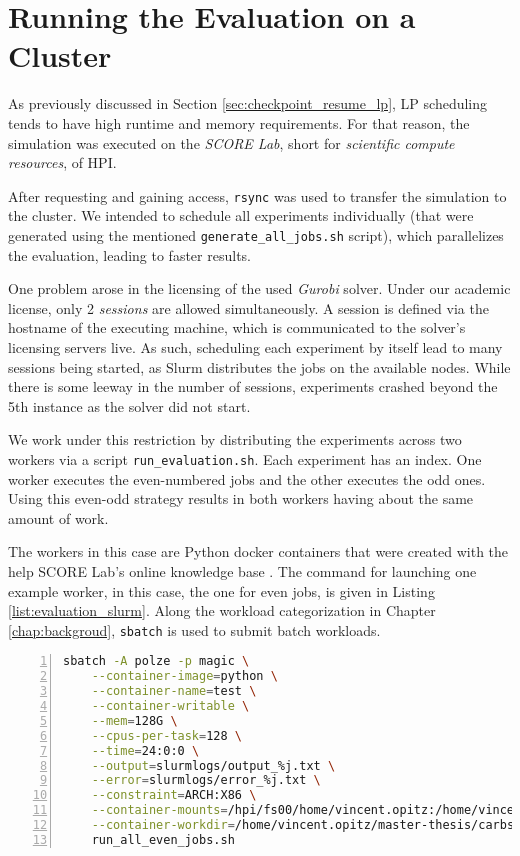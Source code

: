 \section{Running the Evaluation on a Cluster}

As previously discussed in Section \ref{sec:checkpoint_resume_lp}, LP scheduling tends to have high runtime and memory requirements. 
For that reason, the simulation was executed on the \emph{SCORE Lab}, short for \emph{scientific compute resources}, of HPI.

After requesting and gaining access, \verb|rsync| was used to transfer the simulation to the cluster. 
We intended to schedule all experiments individually (that were generated using the mentioned \verb|generate_all_jobs.sh| script), which parallelizes the evaluation, leading to faster results.

One problem arose in the licensing of the used \emph{Gurobi} solver. 
Under our academic license, only 2 \emph{sessions} are allowed simultaneously.
A session is defined via the hostname of the executing machine, which is communicated to the solver's licensing servers live.
As such, scheduling each experiment by itself lead to many sessions being started, as Slurm distributes the jobs on the available nodes.
While there is some leeway in the number of sessions, experiments crashed beyond the 5th instance as the solver did not start.

We work under this restriction by distributing the experiments across two workers via a script \verb|run_evaluation.sh|.
Each experiment has an index.
One worker executes the even-numbered jobs and the other executes the odd ones. 
Using this even-odd strategy results in both workers having about the same amount of work.

The workers in this case are Python docker containers that were created with the help SCORE Lab's online knowledge base .
The command for launching one example worker, in this case, the one for even jobs, is given in Listing \ref{list:evaluation_slurm}. 
Along the workload categorization in Chapter \ref{chap:backgroud}, \verb|sbatch| is used to submit batch workloads.

\begin{minipage}{\linewidth}
\begin{lstlisting}[language=bash, frame=single, numbers=left, caption={Submitting the evaluation to SCORE Lab's Slurm}, label={list:evaluation_slurm}, basicstyle=\ttfamily]
sbatch -A polze -p magic \
    --container-image=python \
    --container-name=test \
    --container-writable \
    --mem=128G \
    --cpus-per-task=128 \
    --time=24:0:0 \
    --output=slurmlogs/output_%j.txt \
    --error=slurmlogs/error_%j.txt \
    --constraint=ARCH:X86 \
    --container-mounts=/hpi/fs00/home/vincent.opitz:/home/vincent.opitz \
    --container-workdir=/home/vincent.opitz/master-thesis/carbs \
    run_all_even_jobs.sh
        \end{lstlisting}    
\end{minipage}

